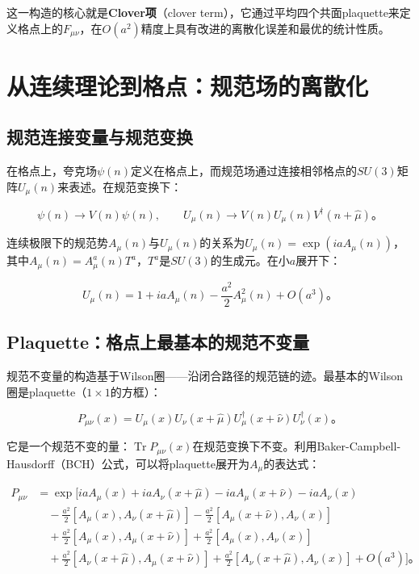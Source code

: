 \documentclass[12pt,a4paper]{ctexart}
\theoremstyle{definition}
\begin{document}
这一构造的核心就是\textbf{Clover项}（clover term）\cite{NoteGluonPDFs}，它通过平均四个共面plaquette来定义格点上的$F_{\mu\nu}$，在$O(a^2)$精度上具有改进的离散化误差和最优的统计性质。

\section{从连续理论到格点：规范场的离散化}

\subsection{规范连接变量与规范变换}

在格点上，夸克场$\psi(n)$定义在格点上，而规范场通过连接相邻格点的$SU(3)$矩阵$U_\mu(n)$来表述。在规范变换下\cite{UKQCD1993}：

\begin{equation}
\psi(n) \to V(n)\psi(n), \qquad U_\mu(n) \to V(n)U_\mu(n)V^\dagger(n+\hat{\mu})。
\label{eq:gauge_transform}
\end{equation}

连续极限下的规范势$A_\mu(n)$与$U_\mu(n)$的关系为$U_\mu(n) = \exp(iaA_\mu(n))$，其中$A_\mu(n) = A_\mu^a(n)T^a$，$T^a$是$SU(3)$的生成元。在小$a$展开下：

\begin{equation}
U_\mu(n) = 1 + iaA_\mu(n) - \frac{a^2}{2}A_\mu^2(n) + O(a^3)。
\label{eq:link_expansion}
\end{equation}

\subsection{Plaquette：格点上最基本的规范不变量}

规范不变量的构造基于Wilson圈——沿闭合路径的规范链的迹\cite{NoteGluonPDFs}。最基本的Wilson圈是plaquette（$1 \times 1$的方框）：

\begin{equation}
P_{\mu\nu}(x) = U_\mu(x) U_\nu(x+\hat{\mu}) U^\dagger_\mu(x+\hat{\nu}) U^\dagger_\nu(x)。
\label{eq:plaquette}
\end{equation}

它是一个规范不变的量：$\operatorname{Tr} P_{\mu\nu}(x)$在规范变换下不变。利用Baker-Campbell-Hausdorff（BCH）公式，可以将plaquette展开为$A_\mu$的表达式\cite{NoteGluonPDFs}：

\begin{equation}
\begin{aligned}
P_{\mu\nu} &= \exp\Big[ iaA_\mu(x) + iaA_\nu(x+\hat{\mu}) - iaA_\mu(x+\hat{\nu}) - iaA_\nu(x) \\
&\quad -\frac{a^2}{2}[A_\mu(x), A_\nu(x+\hat{\mu})] -\frac{a^2}{2}[A_\mu(x+\hat{\nu}), A_\nu(x)] \\
&\quad +\frac{a^2}{2}[A_\mu(x), A_\mu(x+\hat{\nu})] +\frac{a^2}{2}[A_\mu(x), A_\nu(x)] \\
&\quad +\frac{a^2}{2}[A_\nu(x+\hat{\mu}), A_\mu(x+\hat{\nu})] +\frac{a^2}{2}[A_\nu(x+\hat{\mu}), A_\nu(x)] + O(a^3) \Big]。
\end{aligned}
\label{eq:plaquette_BCH}
\end{equation}
\end{document}
